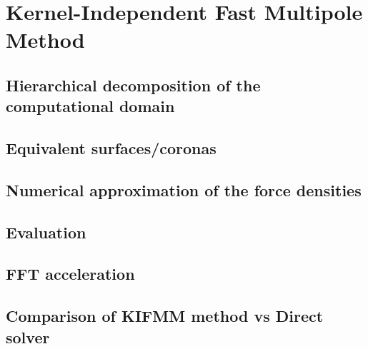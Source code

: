 \section{Kernel-Independent Fast Multipole Method}
\subsection{Hierarchical decomposition of the computational domain}
\subsection{Equivalent surfaces/coronas}
\subsection{Numerical approximation of the force densities}
\subsection{Evaluation}
\subsection{FFT acceleration}
\subsection{Comparison of KIFMM method vs Direct solver}